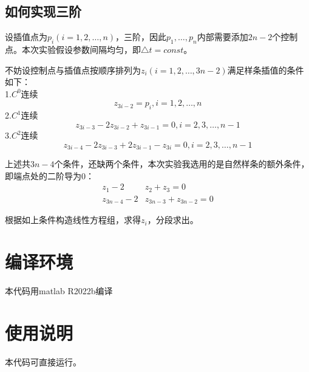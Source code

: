 \documentclass{article}
\newcommand{\Bezier}{B\'ezier}%
\begin{document}
\subsection{如何实现三阶}
	设插值点为$p_i(i=1,2,\dots,n)$，三阶，因此$p_1,\dots,p_n$内部需要添加$2n-2$个控制点。本次实验假设参数间隔均匀，即$\triangle t=const$。
	
	不妨设控制点与插值点按顺序排列为$z_i(i=1,2,\dots,3n-2)$满足样条插值的条件如下：\\
	1.$C^0$连续
	\begin{equation}
		z_{3i-2}=p_i,i=1,2,\dots,n
	\end{equation}
	2.$C^1$连续
	\begin{equation}
		z_{3i-3}-2z_{3i-2}+z_{3i-1}=0,i=2,3,\dots,n-1
	\end{equation}
	3.$C^2$连续
	\begin{equation}
		z_{3i-4}-2z_{3i-3}+2z_{3i-1}-z_{3i}=0,i=2,3,\dots,n-1
	\end{equation}

上述共$3n-4$个条件，还缺两个条件，本次实验我选用的是自然样条的额外条件，即端点处的二阶导为0：
	\begin{equation}
		\begin{aligned}
			z_1-2&z_2+z_3=0\\
			z_{3n-4}-2&z_{3n-3}+z_{3n-2}=0
		\end{aligned}
	\end{equation}

	根据如上条件构造线性方程组，求得$z_i$，分段求出。
\section{编译环境}
	本代码用matlab R2022b编译
\section{使用说明}
	本代码可直接运行。
\end{document}

